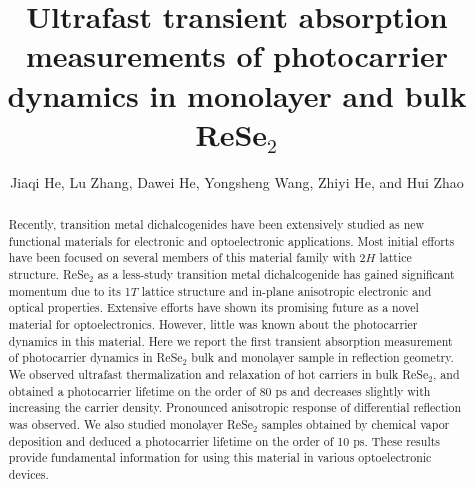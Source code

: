 \documentclass{osa-article}
\begin{document}
\title{Ultrafast transient absorption measurements of photocarrier dynamics in monolayer and bulk ReSe$_2$}

\author{Jiaqi He, Lu Zhang,  Dawei He,  Yongsheng Wang, Zhiyi He,  and Hui Zhao}

\address{Key laboratory of Luminescence and Optical Information, Ministry of education, Institute of Optoelectronic Technology, Beijing Jiaotong University, Beijing 100044, China}

\address{Guangxi Colleges and Universities Key Laboratory of Microwave and Optical Wave-applied Technology, Guilin 541004, China}

\address{Department of Physics and Astronomy, The University of Kansas, Lawrence, Kansas 66045, United States}

\address{These authors contributed equally to this work}

\address{dwhe@bjtu.edu.cn}

\address{yshwang@bjtu.edu.cn}



\begin{abstract}
Recently, transition metal dichalcogenides have been extensively studied as new functional materials for electronic and optoelectronic applications. Most initial efforts have been focused on several members of this material family with 2$H$ lattice structure. ReSe$_2$ as a less-study transition metal dichalcogenide has gained significant momentum due to its 1$T$ lattice structure and in-plane anisotropic electronic and optical properties. Extensive efforts have shown its promising future as a novel material for optoelectronics. However, little was known about the photocarrier dynamics in this material. Here we report the first transient absorption measurement of photocarrier dynamics in ReSe$_2$ bulk and monolayer sample in reflection geometry. We observed ultrafast thermalization and relaxation of hot carriers in bulk ReSe$_2$, and obtained a photocarrier lifetime on the order of 80 ps and decreases slightly with increasing the carrier density. Pronounced anisotropic response of differential reflection was observed. We also studied monolayer ReSe$_2$ samples obtained by chemical vapor deposition and deduced a photocarrier lifetime on the order of 10 ps. These results provide fundamental information for using this material in various optoelectronic devices.
\end{abstract}
\end{document}
